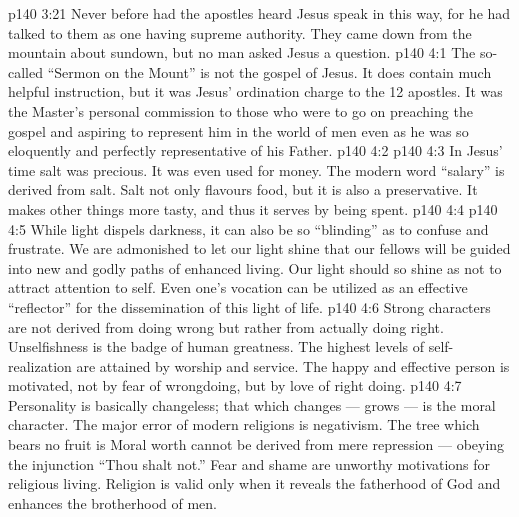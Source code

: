 \vs p140 3:21 \pc Never before had the apostles heard Jesus speak in this way, for he had talked to them as one having supreme authority. They came down from the mountain about sundown, but no man asked Jesus a question.
\vs p140 4:1 The so\hyp{}called “Sermon on the Mount” is not the gospel of Jesus. It does contain much helpful instruction, but it was Jesus’ ordination charge to the 12 apostles. It was the Master’s personal commission to those who were to go on preaching the gospel and aspiring to represent him in the world of men even as he was so eloquently and perfectly representative of his Father.
\vs p140 4:2 \pc {}
\vs p140 4:3 In Jesus’ time salt was precious. It was even used for money. The modern word “salary” is derived from salt. Salt not only flavours food, but it is also a preservative. It makes other things more tasty, and thus it serves by being spent.
\vs p140 4:4 \pc {}
\vs p140 4:5 While light dispels darkness, it can also be so “blinding” as to confuse and frustrate. We are admonished to let our light  shine that our fellows will be guided into new and godly paths of enhanced living. Our light should so shine as not to attract attention to self. Even one’s vocation can be utilized as an effective “reflector” for the dissemination of this light of life.
\vs p140 4:6 Strong characters are not derived from  doing wrong but rather from actually doing right. Unselfishness is the badge of human greatness. The highest levels of self\hyp{}realization are attained by worship and service. The happy and effective person is motivated, not by fear of wrongdoing, but by love of right doing.
\vs p140 4:7 \pc {} Personality is basically changeless; that which changes --- grows --- is the moral character. The major error of modern religions is negativism. The tree which bears no fruit is  Moral worth cannot be derived from mere repression --- obeying the injunction “Thou shalt not.” Fear and shame are unworthy motivations for religious living. Religion is valid only when it reveals the fatherhood of God and enhances the brotherhood of men.
